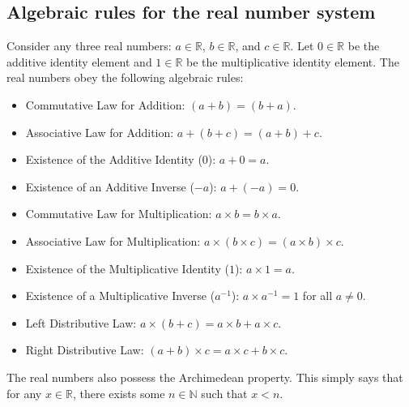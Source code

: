 \documentclass[letterpaper,10pt,english]{jupyterBook}
\begin{document}
\subsection{Algebraic rules for the real number system}
\label{\detokenize{02.sets_numbers_coordinates_distances:algebraic-rules-for-the-real-number-system}}
\sphinxAtStartPar
Consider any three real numbers: \(a \in \mathbb{R}\), \(b \in \mathbb{R}\), and \(c \in \mathbb{R}\). Let \(0 \in \mathbb{R}\) be the additive identity element and \(1 \in \mathbb{R}\) be the multiplicative identity element. The real numbers obey the following algebraic rules:
\begin{itemize}
\item {} 
\sphinxAtStartPar
Commutative Law for Addition: \((a + b) = (b + a)\).

\item {} 
\sphinxAtStartPar
Associative Law for Addition: \(a + (b + c) = (a + b) + c\).

\item {} 
\sphinxAtStartPar
Existence of the Additive Identity (\(0\)): \(a + 0 = a\).

\item {} 
\sphinxAtStartPar
Existence of an Additive Inverse (\(−a\)): \(a + (−a) = 0\).

\item {} 
\sphinxAtStartPar
Commutative Law for Multiplication: \(a \times b = b \times a\).

\item {} 
\sphinxAtStartPar
Associative Law for Multiplication: \(a \times (b \times c) = (a \times b) \times c\).

\item {} 
\sphinxAtStartPar
Existence of the Multiplicative Identity (\(1\)): \(a \times 1 = a\).

\item {} 
\sphinxAtStartPar
Existence of a Multiplicative Inverse (\(a^{−1}\)): \(a \times a^{−1} = 1\) for all \(a \ne 0\).

\item {} 
\sphinxAtStartPar
Left Distributive Law: \(a \times (b + c) = a \times b + a \times c\).

\item {} 
\sphinxAtStartPar
Right Distributive Law: \((a + b) \times c = a \times c + b \times c\).

\end{itemize}

\sphinxAtStartPar
The real numbers also possess the Archimedean property. This simply says that for any \(x \in \mathbb{R}\), there exists some \(n \in \mathbb{N}\) such that \(x < n\).
\end{document}
